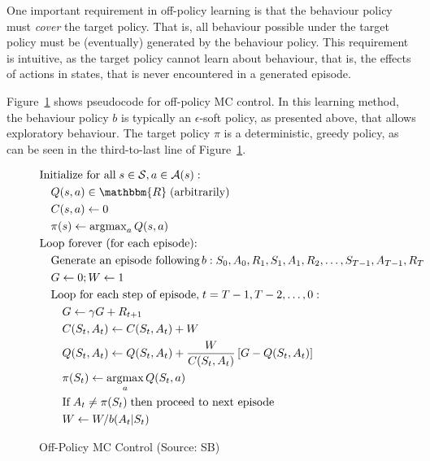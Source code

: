 One important requirement in off-policy learning is that the behaviour policy must \emph{cover} the target policy. That is, all behaviour possible under the target policy must be (eventually) generated by the behaviour policy. This requirement is intuitive, as the target policy cannot learn about behaviour, that is, the effects of actions in states, that is never encountered in a generated episode.

Figure~\ref{fig:offpolicymc} shows pseudocode for off-policy MC control. In this learning method, the behaviour policy $b$ is typically an $\epsilon$-soft policy, as presented above, that allows exploratory behaviour. The target policy $\pi$ is a deterministic, greedy policy, as can be seen in the third-to-last line of Figure~\ref{fig:offpolicymc}.

\begin{figure}
\small
\begin{pseudocodebox}
\vspace{-\baselineskip}
\begin{align*}
& \text{Initialize for all}\; s \in \mathcal{S}, a \in \mathcal{A}(s):\\
& \quad Q(s,a) \in \mathbbm{R}\; \text{(arbitrarily)} \\
& \quad C(s, a) \leftarrow 0 \\
& \quad \pi(s) \leftarrow \operatorname{arg max}_a Q(s, a) \\
& \text{Loop forever (for each episode):} \\
& \quad \text{Generate an episode following}\, b: S_0, A_0, R_1, S_1, A_1, R_2, \ldots, S_{T-1}, A_{T-1}, R_{T} \\
& \quad G \leftarrow 0; W \leftarrow 1 \\
& \quad \text{Loop for each step of episode,}\; t = T-1, T-2, \ldots, 0: \\
& \quad \quad G \leftarrow \gamma G + R_{t+1} \\
& \quad \quad C(S_t, A_t) \leftarrow C(S_t, A_t) + W \\
& \quad \quad Q(S_t, A_t) \leftarrow Q(S_t, A_t) + \frac{W}{C(S_t, A_t)} \left[ G - Q(S_t, A_t) \right] \\
& \quad \quad \pi(S_t) \leftarrow \operatorname*{arg max}_a Q(S_t, a) \\
& \quad \quad \text{If}\; A_t \neq \pi(S_t) \; \text{then proceed to next episode} \\
& \quad \quad W \leftarrow W / b(A_t | S_t)
\end{align*}
\end{pseudocodebox}
\caption[Off-Policy MC Control]{Off-Policy MC Control (Source: SB)}
\label{fig:offpolicymc}
\end{figure}

